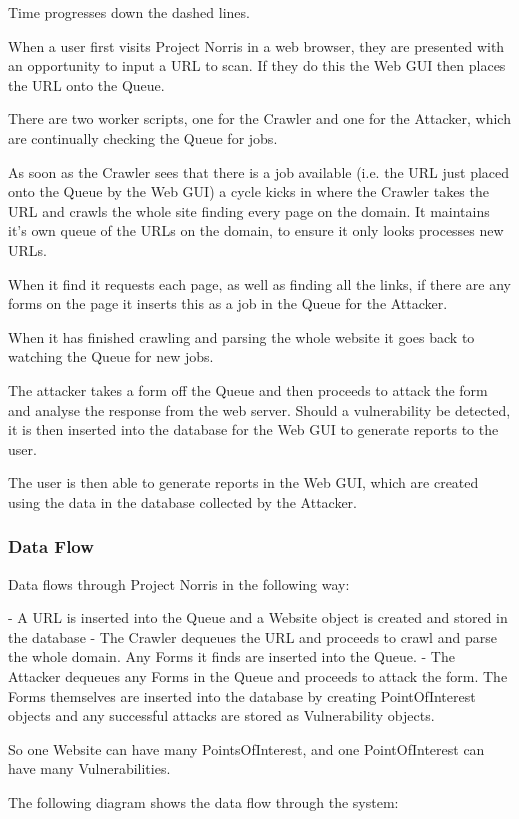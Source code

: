 \documentclass[12pt,a4paper]{article}
\begin{document}
Time progresses down the dashed lines.

When a user first visits Project Norris in a web browser, they are presented with an opportunity to input a URL to scan.  If they do this the Web GUI then places the URL onto the Queue.

There are two worker scripts, one for the Crawler and one for the Attacker, which are continually checking the Queue for jobs.

As soon as the Crawler sees that there is a job available (i.e. the URL just placed onto the Queue by the Web GUI) a cycle kicks in where the Crawler takes the URL and crawls the whole site finding every page on the domain.  It maintains it’s own queue of the URLs on the domain, to ensure it only looks processes new URLs.

When it find it requests each page, as well as finding all the links, if there are any forms on the page it inserts this as a job in the Queue for the Attacker.

When it has finished crawling and parsing the whole website it goes back to watching the Queue for new jobs.

The attacker takes a form off the Queue and then proceeds to attack the form and analyse the response from the web server.  Should a vulnerability be detected, it is then inserted into the database for the Web GUI to generate reports to the user.

The user is then able to generate reports in the Web GUI, which are created using the data in the database collected by the Attacker.

\subsubsection{Data Flow}
Data flows through Project Norris in the following way:

- A URL is inserted into the Queue and a Website object is created and stored in the database
- The Crawler dequeues the URL and proceeds to crawl and parse the whole domain.  Any Forms it finds are inserted into the Queue.
- The Attacker dequeues any Forms in the Queue and proceeds to attack the form.  The Forms themselves are inserted into the database by creating PointOfInterest objects and any successful attacks are stored as Vulnerability objects.  

So one Website can have many PointsOfInterest, and one PointOfInterest can have many Vulnerabilities.

The following diagram shows the data flow through the system:
\end{document}
